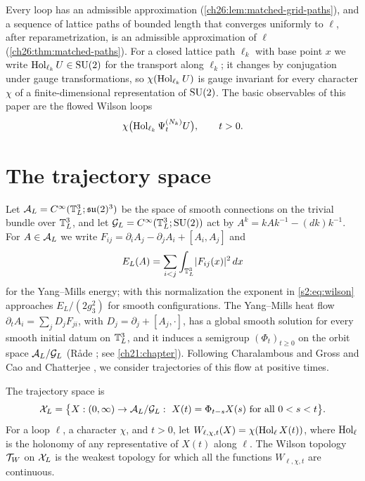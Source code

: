 Every loop has an admissible approximation (\cref{ch26:lem:matched-grid-paths}), and a sequence of lattice paths of bounded length that converges uniformly to $\ell$, after reparametrization, is an admissible approximation of $\ell$ (\cref{ch26:thm:matched-paths}). For a closed lattice path $\ell_k$ with base point $x$ we write $\operatorname{Hol}_{\ell_k}U\in\mathrm{SU}(2)$ for the transport along $\ell_k$; it changes by conjugation under gauge transformations, so $\chi(\operatorname{Hol}_{\ell_k}U)$ is gauge invariant for every character $\chi$ of a finite-dimensional representation of $\mathrm{SU}(2)$. The basic observables of this paper are the flowed Wilson loops
\[
 \chi\bigl(\operatorname{Hol}_{\ell_k}\Psi^{(N_k)}_t U\bigr),\qquad t>0.
\]

\section{The trajectory space}\label{s2:trajectories}

Let $\mathcal A_L=C^\infty(\mathbb T_L^3;\mathfrak{su}(2)^3)$ be the space of smooth connections on the trivial bundle over $\mathbb T_L^3$, and let $\mathcal G_L=C^\infty(\mathbb T_L^3;\mathrm{SU}(2))$ act by $A^k=kAk^{-1}-(dk)k^{-1}$. For $A\in\mathcal A_L$ we write $F_{ij}=\partial_iA_j-\partial_jA_i+[A_i,A_j]$ and
\begin{equation}\label{s2:eq:energy}
 E_L(A)=\sum_{i<j}\int_{\mathbb T_L^3}\lvert F_{ij}(x)\rvert^2\,dx
\end{equation}
for the Yang--Mills energy; with this normalization the exponent in \eqref{s2:eq:wilson} approaches $E_L/(2g_3^2)$ for smooth configurations. The Yang--Mills heat flow $\partial_tA_i=\sum_jD_jF_{ji}$, with $D_j=\partial_j+[A_j,\cdot]$, has a global smooth solution for every smooth initial datum on $\mathbb T_L^3$, and it induces a semigroup $(\Phi_t)_{t\ge0}$ on the orbit space $\mathcal A_L/\mathcal G_L$ (R\aa de \cite{Rade1992}; see \cref{ch21:chapter}). Following Charalambous and Gross \cite{CharalambousGross2013} and Cao and Chatterjee \cite{CCState2023v4}, we consider trajectories of this flow at positive times.

\begin{definition}\label{s2:def:trajectories}
The trajectory space is
\[
 \OrbitSpace=\bigl\{X:(0,\infty)\to\SpaceA/\SpaceG:\ X(t)=\Phi_{t-s}X(s)\text{ for all }0<s<t\bigr\}.
\]
For a loop $\ell$, a character $\chi$, and $t>0$, let $W_{\ell,\chi,t}(X)=\chi(\operatorname{Hol}_\ell X(t))$, where $\operatorname{Hol}_\ell$ is the holonomy of any representative of $X(t)$ along $\ell$. The Wilson topology $\mathcal T_W$ on $\mathcal X_L$ is the weakest topology for which all the functions $W_{\ell,\chi,t}$ are continuous.
\end{definition}

